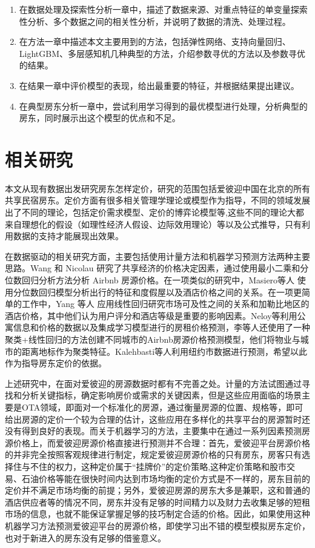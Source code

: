 \documentclass{article}
\begin{document}
\begin{multicols}{2}
\begin{enumerate}
	\item 在数据处理及探索性分析一章中，描述了数据来源、对重点特征的单变量探索性分析、多个数据之间的相关性分析，并说明了数据的清洗、处理过程。
	\item 在方法一章中描述本文主要用到的方法，包括弹性网络、支持向量回归、LightGBM、多层感知机几种典型的方法，介绍参数寻优的方法以及参数寻优的结果。
	\item 在结果一章中评价模型的表现，给出最重要的特征，并根据结果提出建议。
	\item 在典型房东分析一章中，尝试利用学习得到的最优模型进行处理，分析典型的房东，同时展示出这个模型的优点和不足。
\end{enumerate}
\section{相关研究}
本文从现有数据出发研究房东怎样定价，研究的范围包括爱彼迎中国在北京的所有共享民宿房东。定价方面有很多相关管理学理论或模型作为指导，不同的领域发展出了不同的理论，包括定价需求模型、定价的博弈论模型等\cite{ozer2012oxford},这些不同的理论大都来自理想化的假设（如理性经济人假设、边际效用理论）等以及公式推导，只有利用数据的支持才能展现出效果。
\par 在数据驱动的相关研究方面，主要包括使用计量方法和机器学习预测方法两种主要思路。Wang 和 Nicolau\cite{wang2017price} 研究了共享经济的价格决定因素，通过使用最小二乘和分位数回归分析方法分析 Airbnb 房源价格。在一项类似的研究中，Masiero等人\cite{masiero2015demand} 使用分位数回归模型分析出行的特征和度假屋以及酒店价格之间的关系。在一项更简单的工作中，Yang 等人\cite{yang2016market} 应用线性回归研究市场可及性之间的关系和加勒比地区的酒店价格，其中他们认为用户评分和酒店等级是重要的影响因素。Neloy等利用公寓信息和价格的数据以及集成学习模型进行的房租价格预测\cite{文献综述-房屋价格预测}，李等人\cite{li2016reasonable}还使用了一种聚类+线性回归的方法创建不同城市的Airbnb房源价格预测模型，他们将物业与城市的距离地标作为聚类特征。Kalehbasti等人\cite{kalehbasti2019airbnb}利用纽约市数据进行预测，希望以此作为指导房东定价的依据。
\par 上述研究中，在面对爱彼迎的房源数据时都有不完善之处。计量的方法试图通过寻找和分析关键指标，确定影响房价或需求的关键因素，但是这些应用面临的场景主要是OTA领域，即面对一个标准化的房源，通过衡量房源的位置、规格等，即可给出房源的定价一个较为合理的估计，这些应用在多样化的共享平台的房源暂时还没有得到良好的表现。而关于机器学习的方法，主要集中在通过一系列因素预测房源价格上，而爱彼迎房源价格直接进行预测并不合理：首先，爱彼迎平台房源价格的并非完全按照客观规律进行制定，规定爱彼迎房源价格的只有房东，房客只有选择住与不住的权力，这种定价属于“挂牌价”的定价策略\cite{ozer2012oxford},这种定价策略和股市交易、石油价格等能在很快时间内达到市场均衡的定价方式是不一样的，房东目前的定价并不满足市场均衡的前提；另外，爱彼迎房源的房东大多是兼职，这和普通的酒店供应者等的情况不同，房东并没有足够的时间精力以及财力去收集足够的短租市场的信息，也就不能保证掌握足够的技巧制定合适的价格。因此，如果使用这种机器学习方法预测爱彼迎平台的房源价格，即使学习出不错的模型模拟房东定价，也对于新进入的房东没有足够的借鉴意义。

\end{multicols}
\end{document}
